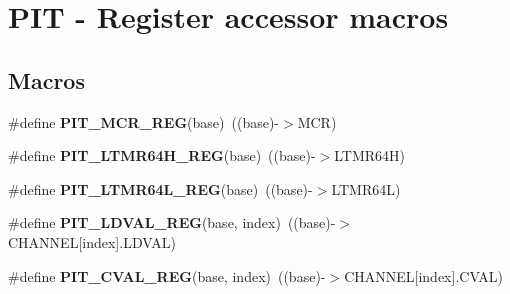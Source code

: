 \hypertarget{group___p_i_t___register___accessor___macros}{}\section{P\+IT -\/ Register accessor macros}
\label{group___p_i_t___register___accessor___macros}
\subsection*{Macros}
\begin{DoxyCompactItemize}
\item 
\mbox{\label{group___p_i_t___register___accessor___macros_ga01f1ee5f7f451b1f6f7f1b3549c63303}} 
\#define {\bfseries P\+I\+T\+\_\+\+M\+C\+R\+\_\+\+R\+EG}(base)~((base)-\/$>$M\+CR)
\item 
\mbox{\label{group___p_i_t___register___accessor___macros_ga374ce53fa45b4b86f5245c6c49adf73b}} 
\#define {\bfseries P\+I\+T\+\_\+\+L\+T\+M\+R64\+H\+\_\+\+R\+EG}(base)~((base)-\/$>$L\+T\+M\+R64H)
\item 
\mbox{\label{group___p_i_t___register___accessor___macros_ga992193153e2d2e13ea243b0045d20528}} 
\#define {\bfseries P\+I\+T\+\_\+\+L\+T\+M\+R64\+L\+\_\+\+R\+EG}(base)~((base)-\/$>$L\+T\+M\+R64L)
\item 
\mbox{\label{group___p_i_t___register___accessor___macros_gaa1c49ea81e45e7ae3407b2b804432381}} 
\#define {\bfseries P\+I\+T\+\_\+\+L\+D\+V\+A\+L\+\_\+\+R\+EG}(base,  index)~((base)-\/$>$C\+H\+A\+N\+N\+EL\mbox{[}index\mbox{]}.L\+D\+V\+AL)
\item 
\mbox{\label{group___p_i_t___register___accessor___macros_gaac9edbb5229fcbcd8d71f5fdeab96590}} 
\#define {\bfseries P\+I\+T\+\_\+\+C\+V\+A\+L\+\_\+\+R\+EG}(base,  index)~((base)-\/$>$C\+H\+A\+N\+N\+EL\mbox{[}index\mbox{]}.C\+V\+AL)
\item 
\mbox{\label{group___p_i_t___register___accessor___macros_gaa338edf83b961108a6dcdd43c80ed8c6}} 

\end{DoxyCompactItemize}
